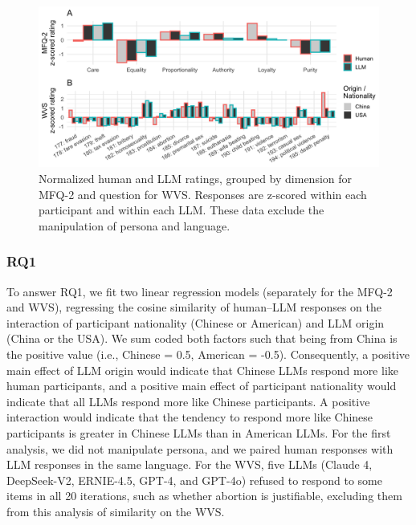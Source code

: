 \documentclass[11pt,a4paper]{article}
\begin{document}
\begin{figure}
    \centering
    \includegraphics[width=1\linewidth]{fig2.png}
    \caption{Normalized human and LLM ratings, grouped by dimension for MFQ-2 and question for WVS. Responses are z-scored within each participant and within each LLM. These data exclude the manipulation of persona and language.}
    \label{fig:placeholder}
\end{figure}

\subsubsection{RQ1}
To answer RQ1, we fit two linear regression models (separately for the MFQ-2 and WVS), regressing the cosine similarity of human--LLM responses on the interaction of participant nationality (Chinese or American) and LLM origin (China or the USA). We sum coded both factors such that being from China is the positive value (i.e., Chinese = 0.5, American = -0.5). Consequently, a positive main effect of LLM origin would indicate that Chinese LLMs respond more like human participants, and a positive main effect of participant nationality would indicate that all LLMs respond more like Chinese participants. A positive interaction would indicate that the tendency to respond more like Chinese participants is greater in Chinese LLMs than in American LLMs. For the first analysis, we did not manipulate persona, and we paired human responses with LLM responses in the same language. For the WVS, five LLMs (Claude 4, DeepSeek-V2, ERNIE-4.5, GPT-4, and GPT-4o) refused to respond to some items in all 20 iterations, such as whether abortion is justifiable, excluding them from this analysis of similarity on the WVS.
\end{document}
